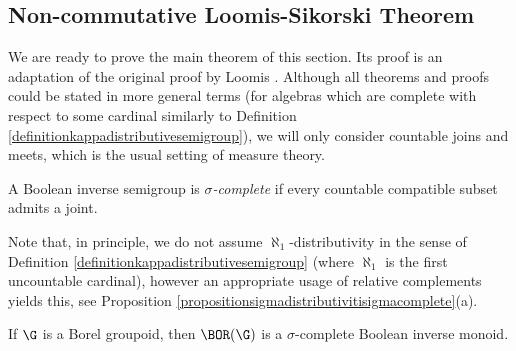 

\subsection{Non-commutative Loomis-Sikorski Theorem}

We are ready to prove the main theorem of this section. Its proof is an adaptation of the original proof by Loomis \cite{MR0021084}. Although all theorems and proofs could be stated in more general terms (for algebras which are complete with respect to some cardinal similarly to Definition \ref{definitionkappadistributivesemigroup}), we will only consider countable joins and meets, which is the usual setting of measure theory.

\begin{definition}%
A Boolean inverse semigroup is \emph{$\sigma$-complete} if every countable compatible subset admits a joint.%
\end{definition}

Note that, in principle, we do not assume $\aleph_1$-distributivity in the sense of Definition \ref{definitionkappadistributivesemigroup} (where $\aleph_1$ is the first uncountable cardinal), however an appropriate usage of relative complements yields this, see Proposition \ref{propositionsigmadistributivitisigmacomplete}(a).

\begin{example}
If $\G$ is a Borel groupoid, then $\BOR(\G)$ is a $\sigma$-complete Boolean inverse monoid.
\end{example}

